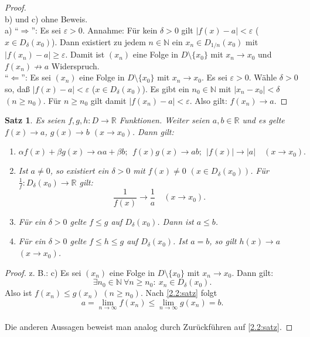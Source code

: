 \documentclass[12pt]{extreport} %
\newcommand{\N}{\mathbb{N}}
\newcommand{\R}{\mathbb{R}}
\theoremstyle{named}
\theoremstyle{itshape}
\newtheorem{satz}[unnamedtheorem]{Satz}
\theoremstyle{normal}
\begin{document}
\begin{proof} ~\\
b) und c) ohne Beweis. \\
a) ``$\Rightarrow$'': Es sei $\varepsilon > 0$. Annahme: Für kein $\delta > 0$ gilt $|f(x)- a| < \varepsilon$ ($x \in D_{\delta}(x_{0})$).
Dann existiert zu jedem $n \in \N$ ein $x_n \in D_{1/n}(x_{0})$ mit $|f(x_n)- a| \ge \varepsilon$. Damit ist $(x_n)$ eine Folge in $D \setminus \{x_0\}$ mit
$x_n \to x_0$ und $f(x_n) \not\to a$ Widerspruch. \\
``$\Leftarrow$'': Es sei $(x_n)$ eine Folge in $D \setminus \{x_0\}$ mit $x_n \to x_0$. Es sei $\varepsilon > 0$. Wähle $\delta > 0$ so, da{\ss} 
$|f(x)- a| < \varepsilon$ ($x \in D_{\delta}(x_{0})$). Es gibt ein $n_0 \in \N$ mit $|x_n-x_0| < \delta$ $(n \ge n_0)$. Für $n \ge n_0$ gilt damit
$|f(x_n)- a| < \varepsilon$. Also gilt: $f(x_n) \to a$.
\end{proof}


\begin{satz} \label{6.3:satz}
	Es seien $f, g, h \colon D \rightarrow \R$ Funktionen. 
	Weiter seien $a, b \in \R$ und es gelte $f(x) \rightarrow a$, $g(x) \rightarrow b$ $(x \rightarrow x_{0})$. Dann gilt:
	\begin{enumerate}
		\item $$\alpha f(x) + \beta g(x) \rightarrow \alpha a + \beta b; ~~ f(x) g(x) \rightarrow a b; ~~ |f(x)| \rightarrow |a| \quad (x \rightarrow x_{0}). $$ 
		\label{6.3.a:satz}
		\item Ist $a \neq 0$, so existiert ein $\delta > 0$ mit $f(x) \neq 0$ $(x \in D_{\delta}(x_{0}))$. Für 
		$\frac{1}{f} \colon D_{\delta}(x_{0}) \rightarrow \R$ gilt: 
		$$\frac{1}{f(x)} \rightarrow \frac{1}{a} \quad (x \rightarrow x_{0}).$$ \label{6.3.b:satz}
		\item Für ein $\delta > 0$ gelte $f \leq g$ auf $D_{\delta}(x_{0})$. Dann ist $a \leq b$. \label{6.3.c:satz}
		\item Für ein $\delta > 0$ gelte $f \leq h \leq g$ auf $D_{\delta}(x_{0})$. Ist $a = b$, so gilt $h(x) \rightarrow a$ $(x \rightarrow x_{0})$. \label{6.3.d:satz}
	\end{enumerate}
\end{satz}

\begin{proof}
	z. B.: c) Es sei $(x_{n})$ eine Folge in $D \setminus \{ x_{0} \}$ mit $x_{n} \rightarrow x_{0}$. Dann gilt: 
		$$\exists n_{0} \in \N ~\forall n \geq n_{0}: ~ x_{n} \in D_{\delta}(x_{0}). $$ 
	Also ist $f(x_{n}) \leq g(x_{n})$ $(n \geq n_{0})$. Nach \ref{2.2:satz} folgt 
	$$a = \lim_{n \to \infty} f(x_{n}) \leq \lim_{n \to \infty} g(x_{n}) = b.$$	\\
	Die anderen Aussagen beweist man analog durch Zurückführen auf \ref{2.2:satz}.
\end{proof}
\end{document}
